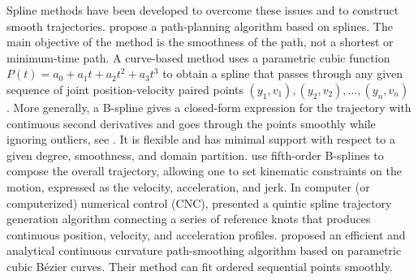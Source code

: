 Spline methods have been developed to overcome these issues and to construct smooth trajectories.  \cite{magid2006spline} propose a path-planning algorithm based on splines. The main objective of the method is the smoothness of the path, not a shortest or minimum-time path. A curve-based method uses a parametric cubic function $P(t)=a_0+a_1t+a_2t^2+a_3t^3$ to obtain a spline that passes through any given sequence of joint position-velocity paired points $(y_1, v_1), (y_2, v_2), \ldots, (y_n,v_n)$ \citep{yu2004curve}. More generally, a B-spline gives a closed-form expression for the trajectory with continuous second derivatives and goes through the points smoothly while ignoring outliers, see \eg \citep{komoriya1989trajectory, ben2004geometric}. It is flexible and has minimal support with respect to a given degree, smoothness, and domain partition. \cite{gasparetto2007new} use fifth-order B-splines to compose the overall trajectory, allowing one to set kinematic constraints on the motion, expressed as the velocity, acceleration, and jerk. In computer (or computerized) numerical control (CNC), \cite{erkorkmaz2001high} presented a quintic spline trajectory generation algorithm connecting a series of reference knots that produces continuous position, velocity, and acceleration profiles. \cite{yang2010analytical} proposed an efficient and analytical continuous curvature path-smoothing algorithm based on parametric cubic B\'{e}zier curves. Their method can fit ordered sequential points smoothly. 


